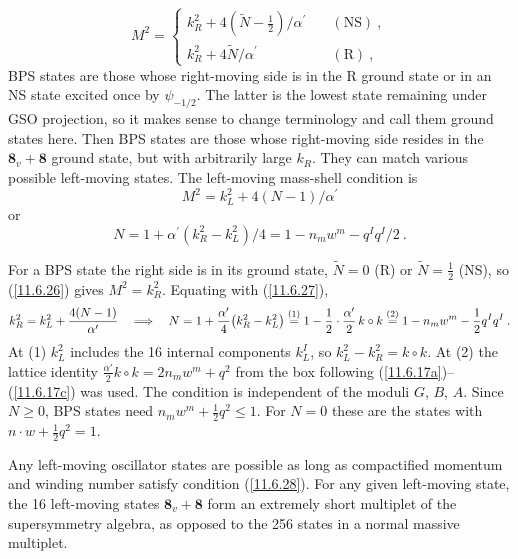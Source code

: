\begin{equation}
	M^{2} = \begin{cases}
		k_{R}^{2}+4(\tilde{N}-\tfrac{1}{2})/\alpha^{\prime} & \quad(\text{NS})\:, \\
		k_{R}^{2}+4\tilde{N}/\alpha^{\prime} &\quad (\text{R})\:,
	\end{cases} \label{11.6.26}
\end{equation}
BPS states are those whose right-moving side is in the R ground state or in an NS state excited once by $\psi_{-1/2}$. The latter is the lowest state remaining under GSO projection, so it makes sense to change terminology and call them ground states here. Then BPS states are those whose right-moving side resides in the $\mathbf{8}_{v}+\mathbf{8}$ ground state, but with arbitrarily large $k_{R}$. They can match various possible left-moving states. The left-moving mass-shell condition is
\begin{equation}
	M^{2}=k_{L}^{2}+4(N-1)/\alpha^{\prime} \label{11.6.27}
\end{equation}
or
\begin{equation}
	N=1+\alpha^{\prime}(k_{R}^{2}-k_{L}^{2})/4=1-n_{m}w^{m}-q^{I}q^{I}/2 \:. \label{11.6.28}
\end{equation}
\begin{tcolorbox}[breakable]
	\begin{remark}
		For a BPS state the right side is in its ground state, $\tilde{N}=0$ (R) or $\tilde{N}=\frac{1}{2}$ (NS), so (\ref{11.6.26}) gives $M^{2}=k_{R}^{2}$. Equating with (\ref{11.6.27}),
		\begin{equation*}
			k_{R}^{2}=k_{L}^{2}+\frac{4(N-1)}{\alpha'}\quad\Longrightarrow\quad N=1+\frac{\alpha'}{4}\bigl(k_{R}^{2}-k_{L}^{2}\bigr)\overset{(1)}{=}1-\frac{1}{2}\cdot\frac{\alpha'}{2}\,k\circ k\overset{(2)}{=}1-n_{m}w^{m}-\frac{1}{2}q^{I}q^{I}\:.
		\end{equation*}
		At (1) $k_{L}^{2}$ includes the 16 internal components $k_{L}^{I}$, so $k_{L}^{2}-k_{R}^{2}=k\circ k$. At (2) the lattice identity $\frac{\alpha'}{2}k\circ k=2n_{m}w^{m}+q^{2}$ from the box following (\ref{11.6.17a})--(\ref{11.6.17c}) was used. The condition is independent of the moduli $G$, $B$, $A$. Since $N\geq0$, BPS states need $n_{m}w^{m}+\frac{1}{2}q^{2}\leq1$. For $N=0$ these are the states with $n\cdot w+\frac{1}{2}q^{2}=1$.
	\end{remark}
\end{tcolorbox}
Any left-moving oscillator states are possible as long as compactified momentum and winding number satisfy condition (\ref{11.6.28}). For any given left-moving state, the 16 left-moving states $\mathbf{8}_{v}+\mathbf{8}$ form an extremely short multiplet of the supersymmetry algebra, as opposed to the 256 states in a normal massive multiplet.

